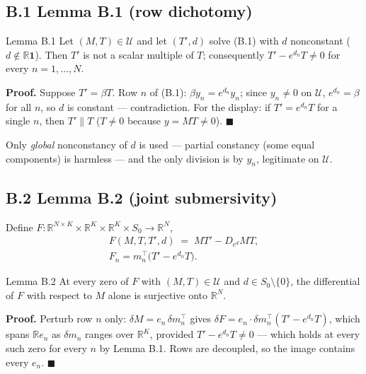\subsection{B.1 Lemma B.1 (row dichotomy)}

\begin{namedthm}{Lemma B.1}
Let $(M,T)\in\mathcal U$ and let $(T',d)$ solve (B.1) with $d$ nonconstant ($d\notin\mathbb R\mathbf 1$). Then $T'$ is not a scalar multiple of $T$; consequently $T'-e^{d_n}T\neq0$ for every $n=1,\dots,N$.
\end{namedthm}

\noindent\textbf{Proof.} Suppose $T'=\beta T$. Row $n$ of (B.1): $\beta y_n=e^{d_n}y_n$; since $y_n\neq0$ on $\mathcal U$, $e^{d_n}=\beta$ for all $n$, so $d$ is constant --- contradiction. For the display: if $T'=e^{d_n}T$ for a single $n$, then $T'\parallel T$ ($T\neq0$ because $y=MT\neq0$). \hfill$\blacksquare$

Only \emph{global} nonconstancy of $d$ is used --- partial constancy (some equal components) is harmless --- and the only division is by $y_n$, legitimate on $\mathcal U$.

\subsection{B.2 Lemma B.2 (joint submersivity)}

Define $F:\mathbb R^{N\times K}\times\mathbb R^K\times\mathbb R^K\times S_0\to\mathbb R^N$,
\begin{equation}
\begin{gathered}
F(M,T,T',d)\;=\;MT'-D_{e^{d}}MT,\\
F_n=m_n^\top\bigl(T'-e^{d_n}T\bigr).
\end{gathered}
\tag{B.2}
\end{equation}

\begin{namedthm}{Lemma B.2}
At every zero of $F$ with $(M,T)\in\mathcal U$ and $d\in S_0\setminus\{0\}$, the differential of $F$ with respect to $M$ alone is surjective onto $\mathbb R^N$.
\end{namedthm}

\noindent\textbf{Proof.} Perturb row $n$ only: $\delta M=e_n\,\delta m_n^\top$ gives $\delta F=e_n\cdot\delta m_n^\top(T'-e^{d_n}T)$, which spans $\mathbb R e_n$ as $\delta m_n$ ranges over $\mathbb R^K$, provided $T'-e^{d_n}T\neq0$ --- which holds at every such zero for every $n$ by Lemma B.1. Rows are decoupled, so the image contains every $e_n$. \hfill$\blacksquare$

